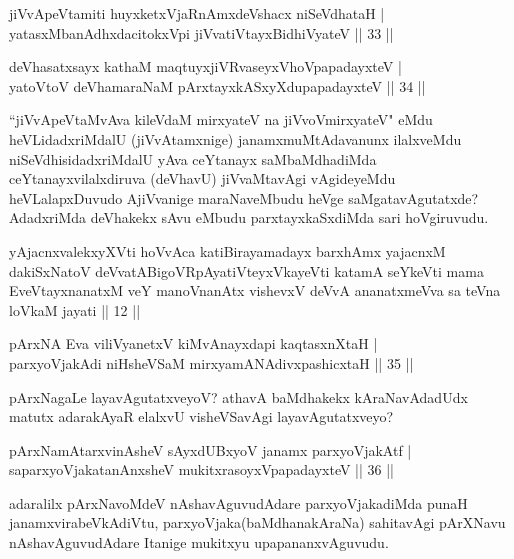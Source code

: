 
\begin{shl}
jiVvApeVtamiti huyxketxVjaRnAmxdeVshacx niSeVdhataH |\\
yatasxMbanAdhxdacitokxV\s pi jiVvatiVtayxBidhiVyateV \hfill || 33 ||
\end{shl}

\begin{shl}
deVhasatxsayx kathaM maqtuyxjiVRvaseyxVhoVpapadayxteV |\\
yatoV\s toV deVhamaraNaM pArxtayxkASxyXdupapadayxteV \hfill || 34 ||
\end{shl}

\begin{artha}
``jiVvApeVtaMvAva kileVdaM mirxyateV na jiVvoVmirxyateV" eMdu heVLidadxriMdalU (jiVvAtamxnige) janamxmuMtAdavanunx ilalxveMdu niSeVdhisidadxriMdalU yAva ceYtanayx saMbaMdhadiMda ceYtanayxvilalxdiruva (deVhavU) 
jiVvaMtavAgi vAgideyeMdu heVLalapxDuvudo AjiVvanige maraNaveMbudu heVge 
saMgatavAgutatxde? AdadxriMda deVhakekx sAvu eMbudu parxtayxkaSxdiMda sari hoVgiruvudu.
\end{artha}

\begin{shl}
yAjacnxvalekxyXVti hoVvAca katiBirayamadayx barxhAmx yajacnxM dakiSxNatoV deVvatABigoVRpAyatiVteyxVkayeVti katamA seYkeVti mama EveVtayxnanatxM veY manoV\s nanAtx vishevxV deVvA ananatxmeVva sa teVna loVkaM jayati || 12 ||
\end{shl}


\begin{shl}
pArxNA Eva viliVyanetxV kiMvA\s nayxdapi kaqtasxnXtaH |\\
parxyoVjakAdi niHsheVSaM mirxyamANAdivxpashicxtaH \hfill || 35 ||
\end{shl}

\begin{artha}
pArxNagaLe layavAgutatxveyoV? athavA baMdhakekx kAraNavAdadUdx matutx adarakAyaR elalxvU 
visheVSavAgi layavAgutatxveyo?
\end{artha}

\begin{shl}
pArxNamAtarxvinAsheV sAyxdUBxyoV janamx parxyoVjakAtf |\\
saparxyoVjakatanAnxsheV mukitxrasoyxVpapadayxteV \hfill || 36 ||
\end{shl}

\begin{artha}
adaralilx pArxNavoMdeV nAshavAguvudAdare parxyoVjakadiMda punaH janamxvirabeVkAdiVtu, parxyoVjaka(baMdhanakAraNa) sahitavAgi pArXNavu nAshavAguvudAdare Itanige mukitxyu upapananxvAguvudu.
\end{artha}

